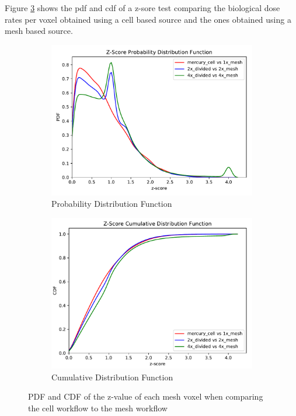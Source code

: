 %
Figure \ref{fig:1zscores} shows the \gls{pdf} and \gls{cdf} of a z-sore test comparing the
biological dose rates per voxel obtained using a cell based source and the ones obtained
using a mesh based source.
\begin{figure}[H]
	\begin{subfigure}[h]{1.0\textwidth}
		\centering
		\includegraphics[scale=0.85, trim={0cm 0cm 0cm 0.9cm},clip]{../figs/toy_p1/PDF_zscore_VPI_all.pdf}
		\caption{Probability Distribution Function}
		\label{fig:1VPI_pdf}
	\end{subfigure}
	\hfill
	\begin{subfigure}[h]{1.0\textwidth}
		\centering
		\includegraphics[scale=0.85, trim={0cm 0cm 0cm 0.8cm},clip]{../figs/toy_p1/CDF_zscore_VPI_all.pdf}
		\caption{Cumulative Distribution Function}
		\label{fig:1VPI_cdf}
	\end{subfigure}
	\caption{PDF and CDF of the z-value of each mesh voxel when comparing the cell workflow to the mesh workflow}
	\label{fig:1zscores}
\end{figure}

